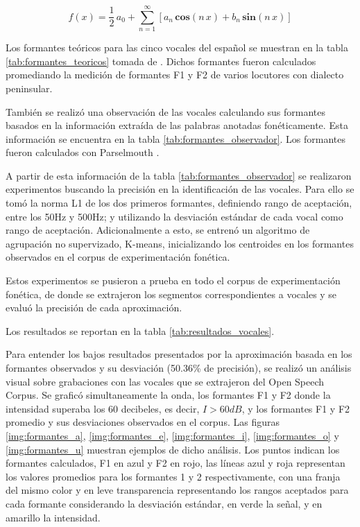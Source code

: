 \begin{equation}
\label{eq:fourier}    
f(x) = \frac{1}{2} \, a_{0} + \sum_{n=1}^{\infty} \left[
   a_{n}\,\mathbf{cos} (n\,x) + b_{n} \,\mathbf{sin} (n\,x) \right]
\end{equation}

Los formantes teóricos para las cinco vocales del español se muestran en la tabla \ref{tab:formantes_teoricos} tomada de \cite{Bradlow1995}. Dichos formantes fueron calculados promediando la medición de formantes F1 y F2 de varios locutores con dialecto peninsular.



También se realizó una observación de las vocales calculando sus formantes basados en la información extra\'ida de las palabras anotadas fonéticamente. Esta información se encuentra en la tabla \ref{tab:formantes_observador}. Los formantes fueron calculados con Parselmouth \cite{parselmouth}.



A partir de esta información de la tabla \ref{tab:formantes_observador} se realizaron experimentos buscando la precisión en la identificación de las vocales. Para ello se tomó la norma L1 \cite{manhatattan_distance} de los dos primeros formantes, definiendo rango de aceptación, entre los 50Hz y 500Hz; y utilizando la desviación estándar de cada vocal como rango de aceptación. Adicionalmente a esto, se entrenó un algoritmo de agrupación no supervizado, K-means, inicializando los centroides en los formantes observados en el corpus de experimentación fonética.

Estos experimentos se pusieron a prueba en todo el corpus de experimentación fonética, de donde se extrajeron los segmentos correspondientes a vocales y se evaluó la precisión de cada aproximación.

Los resultados se reportan en la tabla \ref{tab:resultados_vocales}.



Para entender los bajos resultados presentados por la aproximación basada en los formantes observados y su desviación (50.36\% de precisión), se realizó un análisis visual sobre grabaciones con las vocales que se extrajeron del Open Speech Corpus. Se graficó simultaneamente la onda, los formantes F1 y F2 donde la intensidad superaba los 60 decibeles, es decir, $I > 60 dB$, y los formantes F1 y F2 promedio y sus desviaciones observados en el corpus. Las figuras \ref{img:formantes_a}, \ref{img:formantes_e}, \ref{img:formantes_i}, \ref{img:formantes_o} y \ref{img:formantes_u} muestran ejemplos de dicho análisis. Los puntos indican los formantes calculados, F1 en azul y F2 en rojo, las líneas azul y roja representan los valores promedios para los formantes 1 y 2 respectivamente, con una franja del mismo color y en leve transparencia representando los rangos aceptados para cada formante considerando la desviación estándar, en verde la señal, y en amarillo la intensidad.

